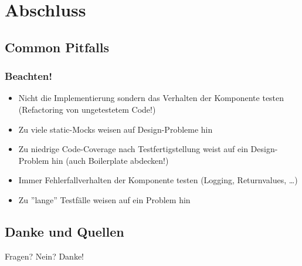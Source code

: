 \documentclass{beamer}
\begin{document}

	\logo{}
	\section{Abschluss}

		\subsection{Common Pitfalls}

			\begin{frame}
				\frametitle{Beachten!}

				\begin{itemize}
					\item{Nicht die Implementierung sondern das Verhalten der Komponente testen (Refactoring von ungetestetem Code!)}
					\pause
					\item{Zu viele static-Mocks weisen auf Design-Probleme hin}
					\pause
					\item{Zu niedrige Code-Coverage nach Testfertigstellung weist auf ein Design-Problem hin (auch Boilerplate abdecken!)}
					\pause
					\item{Immer Fehlerfallverhalten der Komponente testen (Logging, Returnvalues, \ldots)}
					\pause
					\item{Zu ''lange'' Testfälle weisen auf ein Problem hin}
				\end{itemize}
			\end{frame}

		
		\subsection{Danke und Quellen}

			\begin{frame}
				Fragen? Nein? Danke!
			\end{frame}
\end{document}
